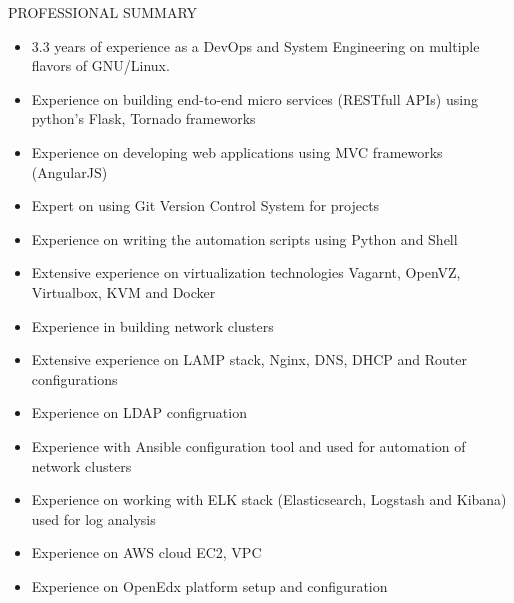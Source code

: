\documentclass{resume} %
\begin{document}
\begin{rSection}{PROFESSIONAL SUMMARY}
  
  \begin{itemize}
    
  \item 3.3 years of experience as a DevOps and System Engineering on multiple
    flavors of GNU/Linux.
    
  \item Experience on building end-to-end micro services (RESTfull APIs) using
    python's Flask, Tornado frameworks
    
  \item Experience on developing web applications using MVC frameworks
    (AngularJS)
    
  \item Expert on using Git Version Control System for projects

  \item Experience on writing the automation scripts using Python and Shell
    
  \item Extensive experience on virtualization technologies Vagarnt, OpenVZ,
    Virtualbox, KVM and Docker
    
  \item Experience in building network clusters
    
  \item Extensive experience on LAMP stack, Nginx, DNS, DHCP and Router
    configurations
    
  \item Experience on LDAP configruation
    
  \item Experience with Ansible configuration tool and used for automation of
    network clusters

  \item Experience on working with ELK stack (Elasticsearch, Logstash and
    Kibana) used for log analysis
    
  \item Experience on AWS cloud EC2, VPC

  \item Experience on OpenEdx platform setup and configuration

  \end{itemize}

\end{rSection}


\end{document}
